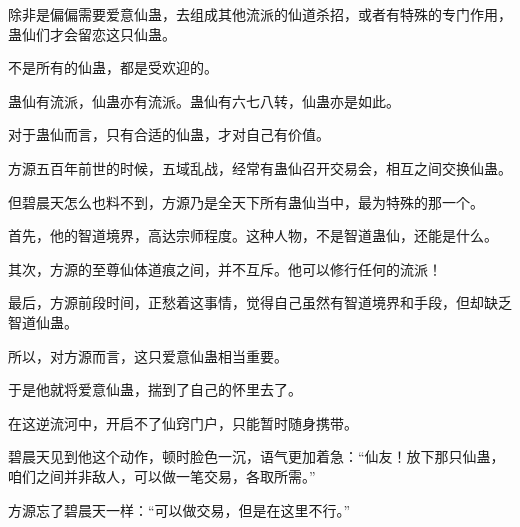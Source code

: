 \begin{this_body}
除非是偏偏需要爱意仙蛊，去组成其他流派的仙道杀招，或者有特殊的专门作用，蛊仙们才会留恋这只仙蛊。

不是所有的仙蛊，都是受欢迎的。

蛊仙有流派，仙蛊亦有流派。蛊仙有六七八转，仙蛊亦是如此。

对于蛊仙而言，只有合适的仙蛊，才对自己有价值。

方源五百年前世的时候，五域乱战，经常有蛊仙召开交易会，相互之间交换仙蛊。

但碧晨天怎么也料不到，方源乃是全天下所有蛊仙当中，最为特殊的那一个。

首先，他的智道境界，高达宗师程度。这种人物，不是智道蛊仙，还能是什么。

其次，方源的至尊仙体道痕之间，并不互斥。他可以修行任何的流派！

最后，方源前段时间，正愁着这事情，觉得自己虽然有智道境界和手段，但却缺乏智道仙蛊。

所以，对方源而言，这只爱意仙蛊相当重要。

于是他就将爱意仙蛊，揣到了自己的怀里去了。

在这逆流河中，开启不了仙窍门户，只能暂时随身携带。

碧晨天见到他这个动作，顿时脸色一沉，语气更加着急：“仙友！放下那只仙蛊，咱们之间并非敌人，可以做一笔交易，各取所需。”

方源忘了碧晨天一样：“可以做交易，但是在这里不行。”

\end{this_body}

